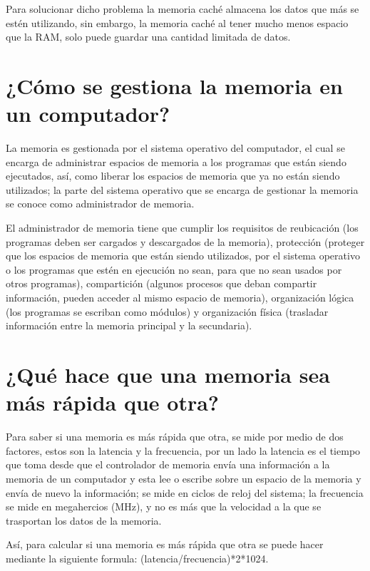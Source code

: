 \documentclass{article}
\begin{document}
Para solucionar dicho problema la memoria caché almacena los datos que más se estén utilizando, sin embargo, la memoria caché al tener mucho menos espacio que la RAM, solo puede guardar una cantidad limitada de datos.\cite{Salazar}

\section{¿Cómo se gestiona la memoria en un computador?}
La memoria es gestionada por el sistema operativo del computador, el cual se encarga de administrar espacios de memoria a los programas que están siendo ejecutados, así, como liberar los espacios de memoria que ya no están siendo utilizados; la parte del sistema operativo que se encarga de gestionar la memoria se conoce como administrador de memoria.
\vspace{0.5cm}

El administrador de memoria tiene que cumplir los requisitos de reubicación (los programas deben ser cargados y descargados de la memoria), protección (proteger que los espacios de memoria que están siendo utilizados, por el sistema operativo o los programas que estén en ejecución no sean, para que no sean usados por otros programas), compartición (algunos procesos que deban compartir información, pueden acceder al mismo espacio de memoria), organización lógica (los programas se escriban como módulos) y organización física (trasladar información entre la memoria principal y la secundaria).\cite{aguilera2015sistemas} 

\section{¿Qué hace que una memoria sea más rápida que otra?}
Para saber si una memoria es más rápida que otra, se mide por medio de dos factores, estos son la latencia y la frecuencia, por un lado la latencia es el tiempo que toma desde que el controlador de memoria envía una información  a la memoria de un computador y esta lee o escribe sobre un espacio de la memoria y envía de nuevo la información; se mide en ciclos de reloj del sistema\cite{Salazar}; la frecuencia se mide en megahercios (MHz), y no es más que la velocidad a la que se trasportan los datos de la memoria.\cite{computerhoy}
\vspace{0.5cm}

Así, para calcular si una memoria es más rápida que otra se puede hacer mediante la siguiente formula: (latencia/frecuencia)*2*1024.\cite{computerhoy}



\end{document}
